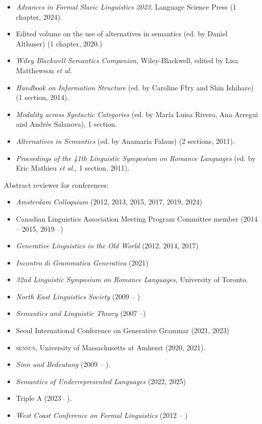 \documentclass[11pt]{article}
\begin{document}
\begin{itemize}
  \item[] \textit{Advances in Formal Slavic Linguistics 2023}, Language Science Press (1 chapter, 2024).
  \item[] Edited volume on the use of alternatives in semantics (ed. by Daniel Althuser) (1 chapter, 2020.)
\item[] \textit{Wiley Blackwell Semantics Companion}, Wiley-Blackwell, edited by Lisa Matthewson \textit{et al.}
\item[] \textit{Handbook on Information Structure} (ed. by Caroline F\'try and Shin Ishihare) (1 section, 2014).
\item[] \textit{Modality across Syntactic Categories} (ed. by Mar\'ia Luisa Rivero, Ana Arregui and Andr\'es Salanova), 1 section.
\item[] \textit{Alternatives in Semantics} (ed. by Anamaria Falaus) (2
  sections, 2011).
\item[] \textit{Proceedings of the 41th Linguistic Symposium on
    Romance Languages} (ed. by Eric Mathieu \textit{et al.}, 1
  section, 2011).
\end{itemize}


Abstract reviewer for conferences:

\begin{itemize}
\item [] \textit{Amsterdam Colloquium} (2012, 2013, 2015, 2017, 2019, 2024)
\item[] Canadian Linguistics Association Meeting Program Committee member (2014 -- 2015, 2019 --)
\item[] \textit{Generative Linguistics in the Old World} (2012, 2014, 2017)
\item[] \textit{Incontro di Grammatica Generativa} (2021)
\item[] \textit{32nd Linguistic Symposium on Romance Languages}, University of Toronto.
\item[] \textit{North East Linguistics Society} (2009 -- )
\item[] \textit{Semantics and Linguistic Theory} (2007 --)
\item[] Seoul International Conference on Generative Grammar (2021, 2023)
\item[] \textsc{sensus}, University of Massachusetts at Amherst (2020, 2021).
\item[] \textit{Sinn und Bedeutung} (2009 -- ).
\item[] \textit{Semantics of Underrepresented Languages} (2022, 2025)
\item[] Triple A (2023-- ).
\item[] \textit{West Coast Conference on Formal Linguistics} (2012 -- )
\end{itemize}
\end{document}
